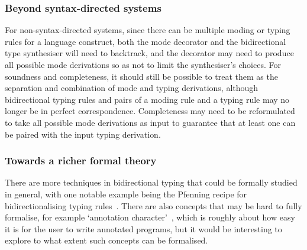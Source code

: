 \subsubsection{Beyond syntax-directed systems}

For non-syntax-directed systems, since there can be multiple moding or typing rules for a language construct, both the mode decorator and the bidirectional type synthesiser will need to backtrack, and the decorator may need to produce all possible mode derivations so as not to limit the synthesiser's choices.
For soundness and completeness, it should still be possible to treat them as the separation and combination of mode and typing derivations, although bidirectional typing rules and pairs of a moding rule and a typing rule may no longer be in perfect correspondence.
Completeness may need to be reformulated to take all possible mode derivations as input to guarantee that at least one can be paired with the input typing derivation.


\subsubsection{Towards a richer formal theory}

There are more techniques in bidirectional typing that could be formally studied in general, with one notable example being the Pfenning recipe for bidirectionalising typing rules~\citep[Section~4]{Dunfield2021}.
There are also concepts that may be hard to fully formalise, for example `annotation character'~\citep[Section~3.4]{Dunfield2021}, which is roughly about how easy it is for the user to write annotated programs, but it would be interesting to explore to what extent such concepts can be formalised.


